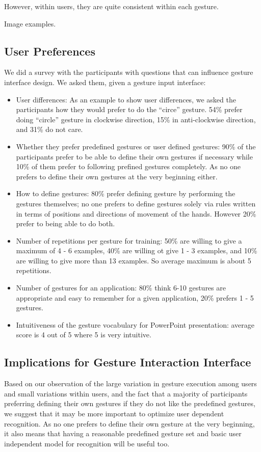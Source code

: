 However, within users, they are
quite consistent within each gesture. 

Image examples.

\subsection{User Preferences}
We did a survey with the participants with questions that can influence
gesture interface design. We asked them, given a gesture input interface:
\begin{itemize}
  \item User differences: As an example to show user differences, we asked
  the participants how they would prefer to do the ``circe'' gesture. 54\%
  prefer doing ``circle'' gesture in clockwise direction, 15\% in anti-clockwise
  direction, and 31\% do not care.
  \item Whether they prefer predefined gestures or user defined gestures: 90\%
  of the participants prefer to be able to define their own gestures if necessary while 10\% of them prefer to following prefined
gestures completely. As no one prefers to define their own gestures at the very
beginning either.
\item How to define gestures: 80\% prefer defining gesture by 
performing the gestures themselves; no one prefers to
define gestures solely via rules written in terms of positions and directions
of movement of the hands.
However 20\% prefer to being able to do both.
\item Number of repetitions per gesture for training: 50\% are willing to give a
maximum of 4 - 6 examples, 40\% are willing ot give 1 - 3 examples, and 10\% are
willing to give more than 13 examples. So average maximum is about 5
repetitions.
\item Number of gestures for an application: 80\% think 6-10 gestures are
appropriate and easy to remember for a given application, 20\% prefers 1 - 5
gestures.
\item Intuitiveness of the gesture vocabulary for PowerPoint presentation:
average score is 4 out of 5 where 5 is very intuitive.
\end{itemize}

\subsection{Implications for Gesture Interaction Interface}
Based on our observation of the large variation in gesture execution among
users and small variations within users, and the fact that a majority of
participants preferring defining their own gestures if they do not like the
predefined gestures, we suggest that it may be more important to optimize user
dependent recognition. As no one prefers to define their own gesture at the very
beginning, it also means that having a reasonable predefined gesture set and
basic user independent model for recognition will be useful too.

